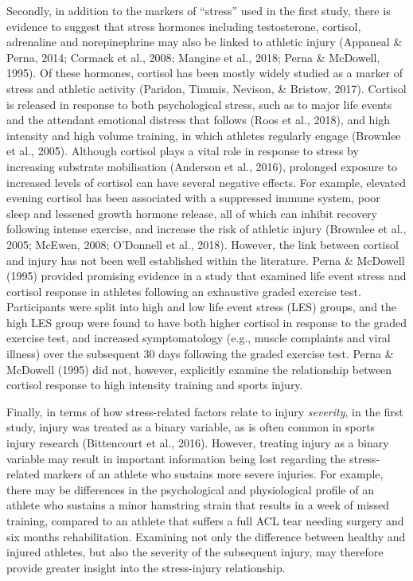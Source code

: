 \documentclass[
  english,
  man,floatsintext]{apa6}
\begin{document}
Secondly, in addition to the markers of \enquote{stress} used in the first study, there is evidence to suggest that stress hormones including testosterone, cortisol, adrenaline and norepinephrine may also be linked to athletic injury (Appaneal \& Perna, 2014; Cormack et al., 2008; Mangine et al., 2018; Perna \& McDowell, 1995).
Of these hormones, cortisol has been mostly widely studied as a marker of stress and athletic activity (Paridon, Timmis, Nevison, \& Bristow, 2017).
Cortisol is released in response to both psychological stress, such as to major life events and the attendant emotional distress that follows (Roos et al., 2018), and high intensity and high volume training, in which athletes regularly engage (Brownlee et al., 2005).
Although cortisol plays a vital role in response to stress by increasing substrate mobilisation (Anderson et al., 2016), prolonged exposure to increased levels of cortisol can have several negative effects.
For example, elevated evening cortisol has been associated with a suppressed immune system, poor sleep and lessened growth hormone release, all of which can inhibit recovery following intense exercise, and increase the risk of athletic injury (Brownlee et al., 2005; McEwen, 2008; O'Donnell et al., 2018).
However, the link between cortisol and injury has not been well established within the literature.
Perna \& McDowell (1995) provided promising evidence in a study that examined life event stress and cortisol response in athletes following an exhaustive graded exercise test.
Participants were split into high and low life event stress (LES) groups, and the high LES group were found to have both higher cortisol in response to the graded exercise test, and increased symptomatology (e.g., muscle complaints and viral illness) over the subsequent 30 days following the graded exercise test.
Perna \& McDowell (1995) did not, however, explicitly examine the relationship between cortisol response to high intensity training and sports injury.

Finally, in terms of how stress-related factors relate to injury \emph{severity}, in the first study, injury was treated as a binary variable, as is often common in sports injury research (Bittencourt et al., 2016).
However, treating injury as a binary variable may result in important information being lost regarding the stress-related markers of an athlete who sustains more severe injuries.
For example, there may be differences in the psychological and physiological profile of an athlete who sustains a minor hamstring strain that results in a week of missed training, compared to an athlete that suffers a full ACL tear needing surgery and six months rehabilitation.
Examining not only the difference between healthy and injured athletes, but also the severity of the subsequent injury, may therefore provide greater insight into the stress-injury relationship.
\end{document}
